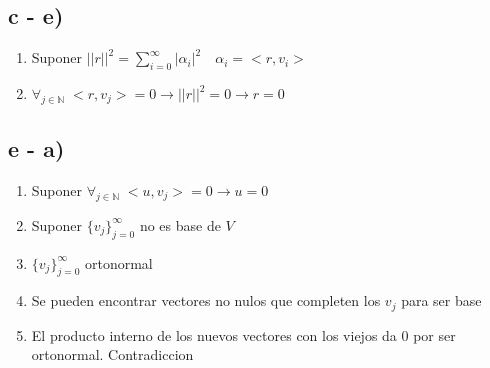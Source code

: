 \subsection*{c - e)}

\begin{enumerate}
  \item Suponer $||r||^2 = \sum_{i=0}^\infty |\alpha_i|^2 \quad \alpha_i = <r,v_i>$
  \item $\forall_{j \in \mathbb{N}} \; <r,v_j> = 0 \to ||r||^2 = 0 \to r = 0$
\end{enumerate}

\subsection*{e - a)}

\begin{enumerate}
  \item Suponer $\forall_{j \in \mathbb{N}} \; <u,v_j> = 0 \to u = 0$
  \item Suponer $\{v_j\}_{j=0}^\infty$ no es base de $V$
  \item $\{v_j\}_{j=0}^\infty$ ortonormal
  \item Se pueden encontrar vectores no nulos que completen los $v_j$ para ser base
  \item El producto interno de los nuevos vectores con los viejos da 0 por ser ortonormal. Contradiccion 
\end{enumerate}
